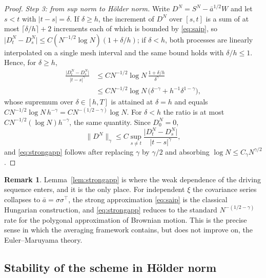 \documentclass[a4paper,fleqn]{cas-dc}
\theoremstyle{definition}
\newtheorem{remark}[theorem]{Remark}
\begin{document}
\begin{proof}
\emph{Step 3: from sup norm to H\"older norm.} Write $D^{N}=S^{N}-\bar a^{1/2}W$ and
let $s<t$ with $\lvert t-s\rvert=\delta$. If $\delta\ge h$, the increment of $D^{N}$
over $[s,t]$ is a sum of at most $\lceil\delta/h\rceil+2$ increments each of which is
bounded by \eqref{eq:saip}, so
$\lvert D^{N}_{t}-D^{N}_{s}\rvert\le C(N^{-1/2}\log N)(1+\delta/h)$; if $\delta<h$,
both processes are linearly interpolated on a single mesh interval and the same bound
holds with $\delta/h\le1$. Hence, for $\delta\ge h$,
\[
\begin{aligned}
\frac{\lvert D^{N}_{t}-D^{N}_{s}\rvert}{\lvert t-s\rvert^{\gamma}}
&\le C N^{-1/2}\log N\,\frac{1+\delta/h}{\delta^{\gamma}}\\
&\le C N^{-1/2}\log N\,\bigl(\delta^{-\gamma}+h^{-1}\delta^{1-\gamma}\bigr),
\end{aligned}
\]
whose supremum over $\delta\in[h,T]$ is attained at $\delta=h$ and equals
$C N^{-1/2}\log N\,h^{-\gamma}=C N^{-(1/2-\gamma)}\log N$. For $\delta<h$ the ratio is
at most $C N^{-1/2}(\log N)h^{-\gamma}$, the same quantity. Since $D^{N}_{0}=0$,
\[
\lVert D^{N}\rVert_{\gamma}\le C\sup_{s\ne t}
\frac{\lvert D^{N}_{t}-D^{N}_{s}\rvert}{\lvert t-s\rvert^{\gamma}},
\]
and \eqref{eq:strongapp} follows after replacing
$\gamma$ by $\gamma/2$ and absorbing $\log N\le C_{\gamma}N^{\gamma/2}$.
\end{proof}

\begin{remark}
\label{rem:saip-scope}
Lemma~\ref{lem:strongapp} is where the weak dependence of the driving sequence enters, and
it is the only place. For independent $\xi$ the covariance series collapses to
$\bar a=\sigma\sigma^{\top}$, the strong approximation \eqref{eq:saip} is the
classical Hungarian construction, and \eqref{eq:strongapp} reduces to the standard
$N^{-(1/2-\gamma)}$ rate for the polygonal approximation of Brownian motion. This is
the precise sense in which the averaging framework contains, but does not improve on,
the Euler--Maruyama theory.
\end{remark}

\subsection{Stability of the scheme in H\"older norm}
\end{document}
